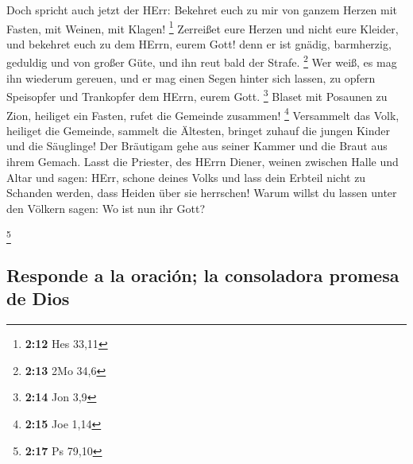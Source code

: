  Doch spricht auch jetzt der HErr: Bekehret euch zu mir
von ganzem Herzen mit Fasten, mit Weinen, mit Klagen! \footnote{\textbf{2:12}
  Hes 33,11}  Zerreißet eure Herzen und nicht eure
Kleider, und bekehret euch zu dem HErrn, eurem Gott! denn er ist gnädig,
barmherzig, geduldig und von großer Güte, und ihn reut bald der Strafe.
\footnote{\textbf{2:13} 2Mo 34,6}  Wer weiß, es mag ihn
wiederum gereuen, und er mag einen Segen hinter sich lassen, zu opfern
Speisopfer und Trankopfer dem HErrn, eurem Gott. \footnote{\textbf{2:14}
  Jon 3,9}  Blaset mit Posaunen zu Zion, heiliget ein
Fasten, rufet die Gemeinde zusammen! \footnote{\textbf{2:15} Joe 1,14}
 Versammelt das Volk, heiliget die Gemeinde, sammelt die
Ältesten, bringet zuhauf die jungen Kinder und die Säuglinge! Der
Bräutigam gehe aus seiner Kammer und die Braut aus ihrem Gemach.
 Lasst die Priester, des HErrn Diener, weinen zwischen
Halle und Altar und sagen: HErr, schone deines Volks und lass dein
Erbteil nicht zu Schanden werden, dass Heiden über sie herrschen! Warum
willst du lassen unter den Völkern sagen: Wo ist nun ihr Gott?

\footnote{\textbf{2:17} Ps 79,10}

\hypertarget{responde-a-la-oraciuxf3n-la-consoladora-promesa-de-dios}{%
\subsection{Responde a la oración; la consoladora promesa de
Dios}\label{responde-a-la-oraciuxf3n-la-consoladora-promesa-de-dios}}

